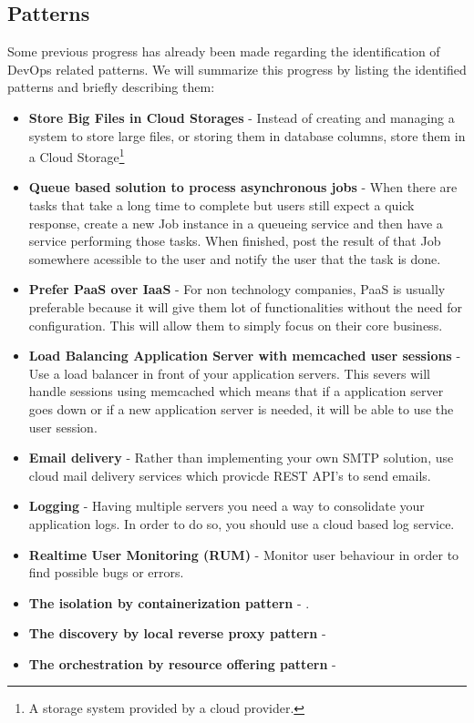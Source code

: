       \subsection{Patterns}
      Some previous progress has already been made regarding the identification of DevOps related patterns. We will summarize this progress by listing the identified patterns and briefly describing them:
      \begin{itemize}
        \item \textbf{Store Big Files in Cloud Storages}\cite{Cukier2013} - Instead of creating and managing a system to store large files, or storing them in database columns, store them in a Cloud Storage\footnote{A storage system provided by a cloud provider.}
        \item \textbf{Queue based solution to process asynchronous jobs}\cite{Cukier2013} - When there are tasks that take a long time to complete but users still expect a quick response, create a new Job instance in a queueing service and then have a service performing those tasks. When finished, post the result of that Job somewhere acessible to the user and notify the user that the task is done.
        \item \textbf{Prefer PaaS over IaaS}\cite{Cukier2013} - For non technology companies, PaaS is usually preferable because it will give them lot of functionalities without the need for configuration. This will allow them to simply focus on their core business.
        \item \textbf{Load Balancing Application Server with memcached user sessions}\cite{Cukier2013} - Use a load balancer in front of your application servers. This severs will handle sessions using memcached which means that if a application server goes down or if a new application server is needed, it will be able to use the user session.
        \item \textbf{Email delivery}\cite{Cukier2013} - Rather than implementing your own SMTP solution, use cloud mail delivery services which provicde REST API's to send emails.
        \item \textbf{Logging}\cite{Cukier2013} - Having multiple servers you need a way to consolidate your application logs. In order to do so, you should use a cloud based log service.
        \item \textbf{Realtime User Monitoring (RUM)}\cite{Cukier2013} - Monitor user behaviour in order to find possible bugs or errors.
        \item \textbf{The isolation by containerization pattern} \cite{Sousa2015} - .
        \item \textbf{The discovery by local reverse proxy pattern} \cite{Sousa2015} - 
        \item \textbf{The orchestration by resource offering pattern} \cite{Sousa2015} - 

      \end{itemize}


